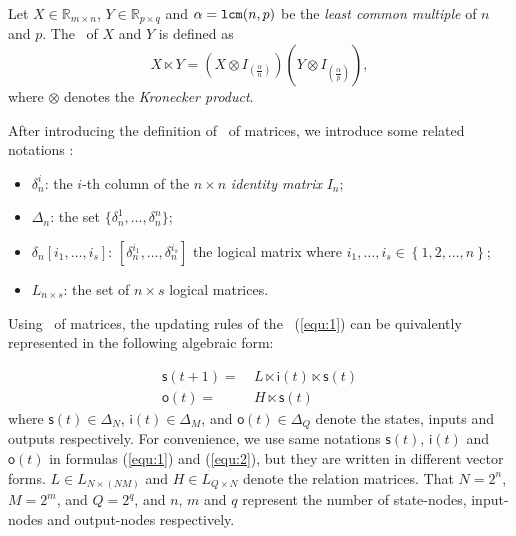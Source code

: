 \begin{definition}[STP] 
	\cite{Cheng2011Analysis} Let $X\in\mathbb{R}_{m\times n}$, $Y\in\mathbb{R}_{p\times q}$ and $\alpha={\tt lcm}(n,p)$ be the {\em least common multiple} of $n$ and $p$. The \STP\ of $X$ and $Y$ is defined as \[X\ltimes Y=(X\otimes I_{(\frac{\alpha}{n})})(Y\otimes I_{(\frac{\alpha}{p})}),\] where $\otimes$ denotes the {\em Kronecker product}. 
\end{definition}

After introducing the definition of \STP\ of matrices,  we introduce some related notations \cite{Zhang2016Observability}:
\begin{itemize}
  \item $\delta^i_n$: the $i$-th column of the $n\times n $ {\em identity matrix} $I_n$;
  \item $\Delta_n$: the set $\{\delta^1_n,\ldots,\delta^n_n \}$; 
  \item $\delta_n \left[i_1,\ldots,i_s\right]$: $\left[\delta^{i_1}_n,\ldots,\delta^{i_s}_n\right]$ the logical matrix where $i_1,\ldots,i_s\in\left\{1,2,\ldots,n\right\}$;
  \item  $L_{n\times s}$: the set of $n\times s$ logical matrices.
\end{itemize}

Using \STP\ of matrices, the updating rules of the \BCN\ (\ref{equ:1}) can be quivalently represented in the following algebraic form:
\begin{definition}

\begin{equation}
\begin{split}
\mathsf{s}(t+1)=&\ L\ltimes{\mathsf{i}(t)}\ltimes{\mathsf{s}(t)}\\
\mathsf{o}(t)=&\ H\ltimes{\mathsf{s}(t)}
\end{split}
\label{equ:2}
\end{equation}
where $\mathsf{s}(t)\in\Delta_N$, $\mathsf{i}(t)\in\Delta_M$, and  $\mathsf{o}(t)\in\Delta_Q$ denote the states, inputs and outputs respectively. For convenience, we use same notations $\mathsf{s}(t)$, $\mathsf{i}(t)$ and $\mathsf{o}(t)$
in formulas (\ref{equ:1}) and (\ref{equ:2}), but they  are written in different vector forms. $L\in L_{N\times\left(NM\right)}$ and $H\in L_{Q\times N}$ denote the relation matrices. That $N=2^n$, $M=2^m$, and $Q=2^q$, and $n$, $m$ and $q$ represent the number of state-nodes, input-nodes and output-nodes respectively. 
\end{definition}

